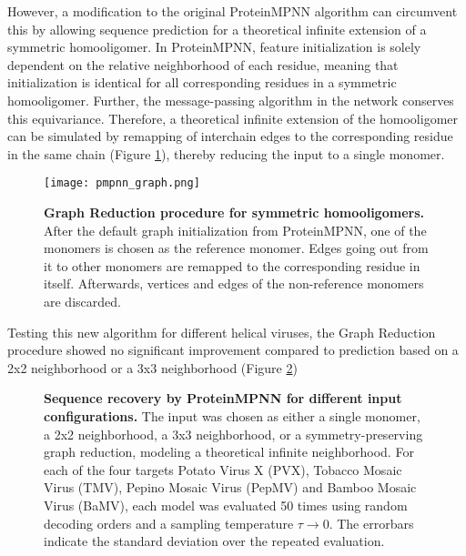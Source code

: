 However, a modification to the original ProteinMPNN algorithm can circumvent this by allowing sequence prediction for a theoretical infinite extension of a symmetric homooligomer. In ProteinMPNN, feature initialization is solely dependent on the relative neighborhood of each residue, meaning that initialization is identical for all corresponding residues in a symmetric homooligomer. Further, the message-passing algorithm in the network conserves this equivariance. Therefore, a theoretical infinite extension of the homooligomer can be simulated by remapping of interchain edges to the corresponding residue in the same chain (Figure \ref{fig:pmpnn_graph}), thereby reducing the input to a single monomer. 

\begin{figure}
\centering
\texttt{[image: pmpnn\_graph.png]}
\caption{\textbf{Graph Reduction procedure for symmetric homooligomers.} After the default graph initialization from ProteinMPNN, one of the monomers is chosen as the reference monomer. Edges going out from it to other monomers are remapped to the corresponding residue in itself. Afterwards, vertices and edges of the non-reference monomers are discarded. }
\label{fig:pmpnn_graph}
\end{figure}

Testing this new algorithm for different helical viruses, the Graph Reduction procedure showed no significant improvement compared to prediction based on a 2x2 neighborhood or a 3x3 neighborhood (Figure \ref{fig:pmpnn_comp})

\begin{figure}
\centering

\caption{\textbf{Sequence recovery by ProteinMPNN for different input configurations.} The input was chosen as either a single monomer, a 2x2 neighborhood, a 3x3 neighborhood, or a symmetry-preserving graph reduction, modeling a theoretical infinite neighborhood. For each of the four targets Potato Virus X (PVX), Tobacco Mosaic Virus (TMV), Pepino Mosaic Virus (PepMV) and Bamboo Mosaic Virus (BaMV), each model was evaluated 50 times using random decoding orders and a sampling temperature $\tau\rightarrow 0$. The errorbars indicate the standard deviation over the repeated evaluation. }
\label{fig:pmpnn_comp}
\end{figure}